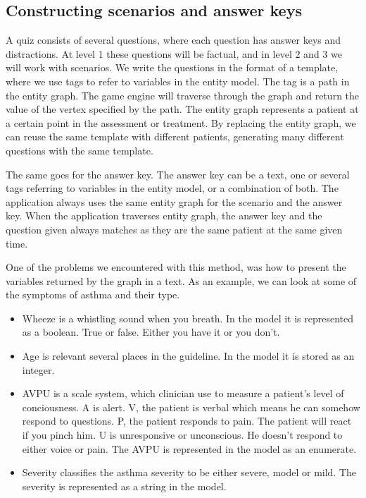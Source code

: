 \subsection{Constructing scenarios and answer keys}
A quiz consists of several questions, where each question has answer keys and distractions. At level 1 these questions will be factual, and in level 2 and 3 we will work with scenarios. We write the questions in the format of a template, where we use tags to refer to variables in the entity model. The tag is a path in the entity graph. The game engine will traverse through the graph and return the value of the vertex specified by the path. The entity graph represents a patient at a certain point in the assessment or treatment. By replacing the entity graph, we can reuse the same template with different patients, generating many different questions with the same template. 

The same goes for the answer key. The answer key can be a text, one or several tags referring to variables in the entity model, or a combination of both. The application always uses the same entity graph for the scenario and the answer key. When the application traverses entity graph, the answer key and the question given always matches as they are the same patient at the same given time.

One of the problems we encountered with this method, was how to present the variables returned by the graph in a text. As an example, we can look at some of the symptoms of asthma and their type.
\begin{itemize}
	\item Wheeze is a whistling sound when you breath. In the model it is represented as a boolean. True or false. Either you have it or you don't.
	\item Age is relevant several places in the guideline. In the model it is stored as an integer.
	\item AVPU is a scale system, which clinician use to measure a patient's level of conciousness. A is alert. V, the patient is verbal which means he can somehow respond to questions. P, the patient responds to pain. The patient will react if you pinch him. U is unresponsive or unconscious. He doesn't respond to either voice or pain. The AVPU is represented in the model as an enumerate.
	\item Severity classifies the asthma severity to be either severe, model or mild. The severity is represented as a string in the model.
\end{itemize}

